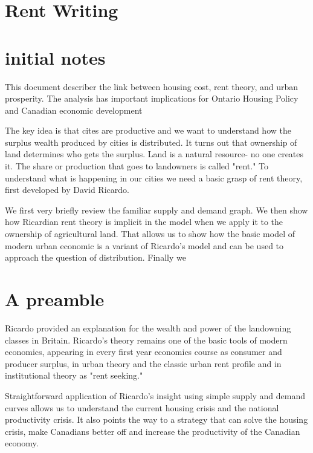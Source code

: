 \section{Rent Writing}
\section{initial notes}
This document describer the link between housing cost, rent theory, and urban prosperity. The analysis has important implications for Ontario Housing Policy and Canadian economic development

The key idea is that cites are productive and we want to understand how the surplus wealth produced by cities is distributed.  It turns out that ownership of land determines  who gets the surplus. Land is a natural resource- no one creates it. The share or production that goes to landowners is called "rent." To  understand what is happening in our cities we need a basic grasp of  rent theory, first developed by David Ricardo. 

We first very briefly review the familiar supply and demand graph. We then show how Ricardian rent theory is implicit in the model when we apply it to  the ownership of agricultural land. That allows us to show how the basic model of modern urban economic is a variant of Ricardo's model and can be used to approach the question of distribution. Finally we 

\section{A preamble}
Ricardo provided an explanation for the wealth and power of the landowning classes in Britain. Ricardo's theory remains one of the basic tools of modern economics, appearing in every first year economics course as consumer and producer surplus, in urban theory and the classic urban rent profile and in institutional theory as  "rent seeking."

Straightforward application of Ricardo's insight using simple supply and demand curves allows us to understand the current housing crisis and the national productivity crisis. It also points the way to a strategy that can solve the housing crisis, make Canadians better off and increase the productivity of the Canadian economy.

